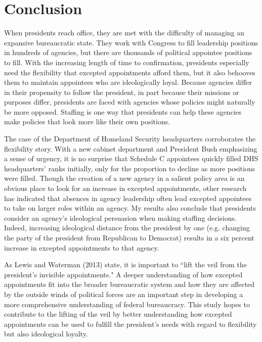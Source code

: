 \documentclass[12pt]{article}
\begin{document}
\section*{Conclusion}	
When presidents reach office, they are met with the difficulty of managing an expansive bureaucratic state. They work with Congress to fill leadership positions in hundreds of agencies, but there are thousands of political appointee positions to fill. With the increasing length of time to confirmation, presidents especially need the flexibility that excepted appointments afford them, but it also behooves them to maintain appointees who are ideologically loyal. Because agencies differ in their propensity to follow the president, in part because their missions or purposes differ, presidents are faced with agencies whose policies might naturally be more opposed. Staffing is one way that presidents can help these agencies make policies that look more like their own positions.

The case of the Department of Homeland Security headquarters corroborates the flexibility story. With a new cabinet department and President Bush emphasizing a sense of urgency, it is no surprise that Schedule C appointees quickly filled DHS headquarters' ranks initially, only for the proportion to decline as more positions were filled. Though the creation of a new agency in a salient policy area is an obvious place to look for an increase in excepted appointments, other research has indicated that absences in agency leadership often lead excepted appointees to take on larger roles within an agency. My results also conclude that presidents consider an agency's ideological persuasion when making staffing decisions. Indeed, increasing ideological distance from the president by one (e.g. changing the party of the president from Republican to Democrat) results in a six percent increase in excepted appointments to that agency. 

As Lewis and Waterman (2013) state, it is important to ``lift the veil from the president's invisible appointments." A deeper understanding of how excepted appointments fit into the broader bureaucratic system and how they are affected by the outside winds of political forces are an important step in developing a more comprehensive understanding of federal bureaucracy. This study hopes to contribute to the lifting of the veil by better understanding how excepted appointments can be used to fulfill the president's needs with regard to flexibility but also ideological loyalty. 
\end{document}
